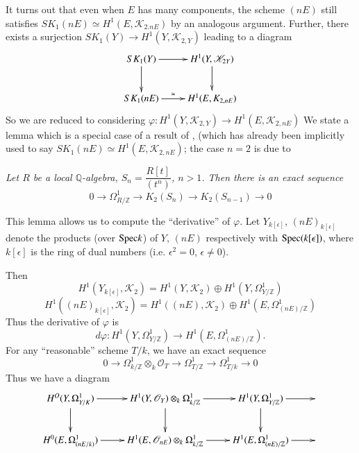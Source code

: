 It turns out that even when $E$ has many components, the scheme $(n E)$ still satisfies $SK_1(nE)\simeq H^{1}(E, \mathscr{K}_{2. nE})$ by an analogous argument. Further, there exists a surjection $SK_1(Y)\to H^{1}(Y, \mathscr{K}_{2, Y})$ leading to a diagram 
$$
\xymatrix{SK_1(Y)\ar[d]\ar[r]& H^{1}(Y, \mathscr{K}_{2 Y})\ar[d]\\
SK_1(n E)\ar[r]^-{\simeq}& H^{1}(E, K_{2, n E})}
$$
So we are reduced to considering $\varphi:H^{1}(Y, \mathscr{K}_{2, Y})\to H^{1}(E, \mathscr{K}_{2,nE })$ We state a lemma which is a special case of a result of \cite{Blochb}, (which has already been implicitly used to say $SK_1(n E)\simeq H^{1}(E, \mathscr{K}_{2, nE})$; the case $n=2$ is due to \cite{Vander}

\begin{lem}
\textit{Let $R$ be a local $\mathbb{Q}$-algebra, $S_n=\dfrac{R[t]}{(t^{n})}$, $n>1$. Then there is an exact sequence}
$$
0\to \Omega^{1}_{R/\mathbb{Z}}\to K_2(S_n)\to K_2(S_{n-1})\to 0
$$
\end{lem}

This lemma allows us to compute the ``derivative'' of $\varphi$. Let $Y_{k[\epsilon]}$, $(n E)_{k[\epsilon]}$ denote the products (over $\mathrm{Spec} k$) of $Y$, $(n E)$ respectively with $\mathrm{Spec} (k[\epsilon])$, where $k[\epsilon]$ is the ring of dual numbers (i.e. $\epsilon^{2}=0$, $\epsilon \neq 0$). 

Then 
$$
H^{1}(Y_{k[\epsilon]},\mathscr{K}_2)=H^{1}(Y, \mathscr{K}_2)\oplus H^{1}\left(Y, \Omega^{1}_{Y/\mathbb{Z}}\right)
$$
$$
H^{1}((n E)_{k[\epsilon]}, \mathscr{K}_2)=H^{1}((n E), \mathscr{K}_2)\oplus H^{1}\left( E, \Omega^{1}_{(n E)/\mathbb{Z}}\right)
$$
\pageoriginale
Thus the derivative of $\varphi$ is 
$$
d\varphi: H^{1}\left(Y, \Omega^{1}_{Y/\mathbb{Z}}\right)\to H^{1}\left(E, \Omega^{1}_{(n E)/\mathbb{Z}}\right).
$$
For any ``reasonable'' scheme $T/k$, we have an exact sequence 
$$
0\to \Omega^{1}_{k/\mathbb{Z}}\otimes_k \mathscr{O}_T\to \Omega^{1}_{T/\mathbb{Z}}\to \Omega^{1}_{T/k}\to 0
$$
Thus we have a diagram
$$
\xymatrix{H^{O}(Y,\ar[d] \Omega^{1}_{Y/K})\ar[r]& H^{1}(Y,\ar[d] \mathscr{O}_Y)\otimes_{k}\Omega^{1}_{k/\mathbb{Z}}\ar[r]&H^{1}(Y,\ar[d] \Omega^{1}_{Y/\mathbb{Z}})\ar[r]&\\
H^{0}(E, \Omega^{1}_{(nE/k)})\ar[r]& H^{1}(E, \mathscr{O}_{n E})\otimes_k\Omega^{1}_{k/\mathbb{Z}}\ar[r]& H^{1}(E, \Omega^{1}_{(nE)/\mathbb{Z}})\ar[r]&}
$$

